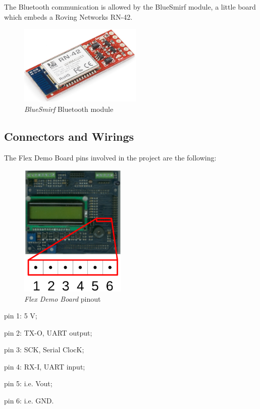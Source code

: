 \documentclass[twoside]{article}
\begin{document}
\begin{multicols}{2}
The Bluetooth communication is allowed by the BlueSmirf module, a little board which embeds a Roving Networks RN-42.

\begin{figure}[H]
  \centering
  \includegraphics[width=2.3in]{img/bluesmirf_presentation}
  \caption{\textit{BlueSmirf} Bluetooth module}
\end{figure}

\subsection{Connectors and Wirings}

The Flex Demo Board pins involved in the project are the following:

\begin{figure}[H]
  \centering
  \includegraphics[width=2in]{img/flex_demo_board_pinout}
  \caption{\textit{Flex Demo Board} pinout}
\end{figure}

\begin{compactitem}
\item pin 1: 5 V;
\item pin 2: TX-O, UART output;
\item pin 3: SCK, Serial ClocK;
\item pin 4: RX-I, UART input;
\item pin 5: i.e. Vout;
\item pin 6: i.e. GND.
\end{compactitem}


\end{multicols}
\end{document}
